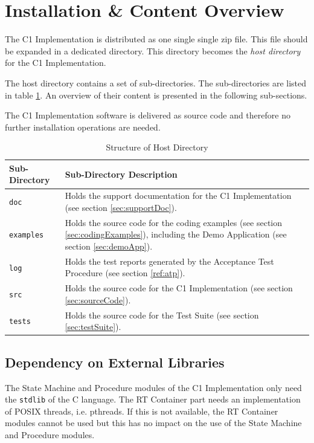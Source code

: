 \documentclass[a4paper,10pt]{article}
\let\stdsection\section
\renewcommand\section{\newpage\stdsection}
\begin{document}
\section{Installation \& Content Overview}
The C1 Implementation is distributed as one single single zip file. This file should be expanded in a dedicated directory. This directory becomes the \emph{host directory} for the C1 Implementation.

The host directory contains a set of sub-directories. The sub-directories are listed in table \ref{tab:hostdir}. An overview of their content is presented in the following sub-sections. 

The C1 Implementation software is delivered as source code and therefore no further installation operations are needed.

\begin{longtable}{|l|p{8.7cm}|}
\caption{Structure of Host Directory}\label{tab:hostdir} \\
\hline
\rowcolor{gray}
\textbf{Sub-Directory} & \textbf{Sub-Directory Description}\\
\hline\hline
\texttt{doc} & Holds the support documentation for the C1 Implementation (see section \ref{sec:supportDoc}).\\
\hline
\texttt{examples} & Holds the source code for the coding examples (see section \ref{sec:codingExamples}), including the Demo Application (see section \ref{sec:demoApp}).\\
\hline
\texttt{log} & Holds the test reports generated by the Acceptance Test Procedure (see section \ref{ref:atp}).\\
\hline
\texttt{src} & Holds the source code for the C1 Implementation (see section \ref{sec:sourceCode}).\\
\hline
\texttt{tests} & Holds the source code for the Test Suite (see section \ref{sec:testSuite}).\\
\hline
\end{longtable}

\subsection{Dependency on External Libraries}\label{sec:DepExtLib}
The State Machine and Procedure modules of the C1 Implementation only need the \texttt{stdlib} of the C language. The RT Container part needs an implementation of POSIX threads, i.e. pthreads. If this is not available, the RT Container modules cannot be used but this has no impact on the use of the State Machine and Procedure modules.
\end{document}
